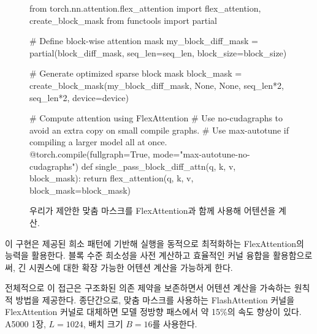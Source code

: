 \documentclass{article} %
\begin{document}
\begin{figure}
    \centering
\begin{minipage}{\linewidth}
\begin{python}
from torch.nn.attention.flex_attention import flex_attention, create_block_mask
from functools import partial

# Define block-wise attention mask
my_block_diff_mask = partial(block_diff_mask, seq_len=seq_len, block_size=block_size)

# Generate optimized sparse block mask
block_mask = create_block_mask(my_block_diff_mask, None, None, seq_len*2, seq_len*2, device=device)

# Compute attention using FlexAttention
# Use no-cudagraphs to avoid an extra copy on small compile graphs. 
# Use max-autotune if compiling a larger model all at once.
@torch.compile(fullgraph=True, mode="max-autotune-no-cudagraphs")
def single_pass_block_diff_attn(q, k, v, block_mask):
    return flex_attention(q, k, v, block_mask=block_mask)
\end{python}
\end{minipage}
    \caption{우리가 제안한 맞춤 마스크를 FlexAttention과 함께 사용해 어텐션을 계산.}
\end{figure}



이 구현은 제공된 희소 패턴에 기반해 실행을 동적으로 최적화하는 FlexAttention의 능력을 활용한다. 블록 수준 희소성을 사전 계산하고 효율적인 커널 융합을 활용함으로써, 긴 시퀀스에 대한 확장 가능한 어텐션 계산을 가능하게 한다.



전체적으로 이 접근은 구조화된 의존 제약을 보존하면서 어텐션 계산을 가속하는 원칙적 방법을 제공한다. 종단간으로, 맞춤 마스크를 사용하는 FlashAttention 커널을 FlexAttention 커널로 대체하면 모델 정방향 패스에서 약 15\%의 속도 향상이 있다. A5000 1장, $L=1024$, 배치 크기 $B=16$를 사용한다.
\newpage
\end{document}
